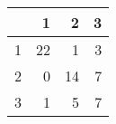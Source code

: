 \begin{tabular}{rrrr}
  \hline
 & 1 & 2 & 3 \\ 
  \hline
1 &  22 &   1 &   3 \\ 
  2 &   0 &  14 &   7 \\ 
  3 &   1 &   5 &   7 \\ 
   \hline
\end{tabular}
